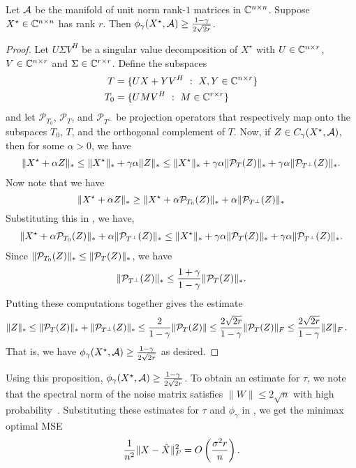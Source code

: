 \begin{prop}
Let $\mathcal{A}$ be the manifold of unit norm rank-$1$ matrices in $\mathbb{C}^{n\times n}$. Suppose $X^\star \in \mathbb{C}^{n\times n}$ has rank $r$.  Then $\phi_\gamma(X^\star,\mathcal{A}) \geq \frac{1-\gamma}{2\sqrt{2r}}$. 
\end{prop}

\begin{proof}
Let $U \Sigma V^H$ be a singular value decomposition of $X^\star$ with $U \in \mathbb{C}^{n \times r}$, $V \in \mathbb{C}^{n \times r}$ and $\Sigma \in \mathbb{C}^{r \times r}$. Define the subspaces 
\begin{align*}
T &= \{U X + Y V^H ~:~ X, Y \in \mathbb{C}^{n \times r} \}\\
T_0 &= \{U M V^H ~:~ M \in \mathbb{C}^{r \times r} \}
\end{align*}
and let $\mathcal{P}_{T_0}$, $\mathcal{P}_{T}$, and $\mathcal{P}_{T^\perp}$ be projection operators that respectively map onto the subspaces $T_0$, $T$, and the orthogonal complement of $T$. Now, if $Z \in C_\gamma(X^\star, \mathcal{A})$, then for some $\alpha > 0$,  we have
\begin{align}
\label{eq:cone_matrix}
\lVert X^\star + \alpha Z\rVert_* \leq 
\lVert X^\star\rVert_* + \gamma \alpha \lVert Z\rVert_*
\leq \lVert X^\star\rVert_* + \gamma \alpha \lVert\mathcal{P}_T (Z)\rVert_* +  \gamma \alpha \lVert\mathcal{P}_{T^\perp} (Z)\rVert_*.
\end{align}
Now note that we have
\[
\lVert X^\star + \alpha Z\rVert_* \geq \lVert X^\star + \alpha\mathcal{P}_{T_0} (Z)\rVert_* + \alpha\lVert\mathcal{P}_{T^\perp} (Z)\rVert_*
\]
Substituting this in , we have,
\begin{align*}
\lVert X^\star + \alpha\mathcal{P}_{T_0} (Z)\rVert_* + \alpha\lVert\mathcal{P}_{T^\perp} (Z)\rVert_* 
\leq \lVert X^\star\rVert_* + \gamma \alpha \lVert\mathcal{P}_T (Z)\rVert_* +  \gamma \alpha \lVert\mathcal{P}_{T^\perp} (Z)\rVert_*.
\end{align*}
Since $\lVert\mathcal{P}_{T_0} (Z)\rVert_* \leq \lVert\mathcal{P}_T (Z)\rVert_*$, we have 
\[
\lVert\mathcal{P}_{T^\perp} (Z)\rVert_* \leq \frac{1+\gamma}{1-\gamma}\lVert\mathcal{P}_T(Z)\rVert_*.
\]
Putting these computations together gives the estimate
\begin{align*}
\lVert Z\rVert_* &\leq \lVert\mathcal{P}_T(Z)\rVert_* + \lVert\mathcal{P}_{T^\perp}(Z)\rVert_* \leq \frac{2}{1-\gamma}\lVert\mathcal{P}_T(Z)\rVert
 \leq \frac{2\sqrt{2r}}{1-\gamma}\lVert\mathcal{P}_T(Z)\rVert_F
 \leq \frac{2\sqrt{2r}}{1-\gamma}\lVert Z\rVert_F\,.
\end{align*}
That is, we have $\phi_\gamma(X^\star,\mathcal{A}) \geq \frac{1-\gamma}{2\sqrt{2r}}$ as desired.
\end{proof} 


Using this proposition, $\phi_\gamma(X^\star,\mathcal{A}) \geq
\frac{1-\gamma}{2\sqrt{2r}}$. To obtain an estimate for $\tau$, we note that
the spectral norm of the noise matrix satisfies $\|W\|\leq
2\sqrt{n}$ with high probability~\cite{Davidson01}. Substituting these
estimates for $\tau$ and $\phi_\gamma$ in , we get
the minimax optimal MSE
\begin{align*}
\frac{1}{n^2}\lVert X-\hat{X}\rVert_F^2 = O\left( \frac{\sigma^2 r}{n} \right).
\end{align*}

